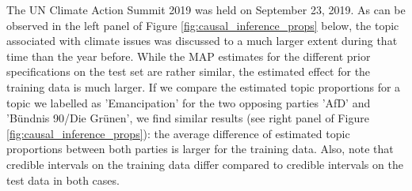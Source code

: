 The UN Climate Action Summit 2019 was held on September 23, 2019. As can be observed in the left panel of Figure \ref{fig:causal_inference_props} below, the topic associated with climate issues was discussed to a much larger extent during that time than the year before. While the MAP estimates for the different prior specifications on the test set are rather similar, the estimated effect for the training data is much larger. If we compare the estimated topic proportions for a topic we labelled as 'Emancipation' for the two opposing parties 'AfD' and 'B{\"u}ndnis 90/Die Gr{\"u}nen', we find similar results (see right panel of Figure \ref{fig:causal_inference_props}): the average difference of estimated topic proportions between both parties is larger for the training data. Also, note that credible intervals on the training data differ compared to credible intervals on the test data in both cases.

